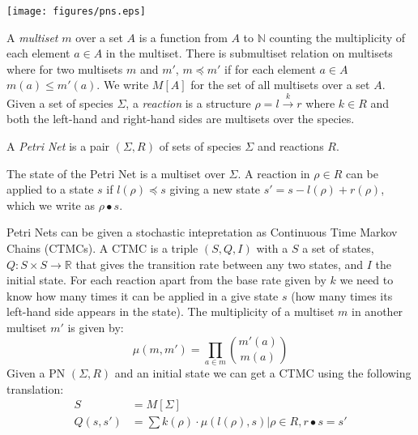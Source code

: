 \documentclass[phd]{infthesis}
\begin{document}
\begin{center}
    \texttt{[image: figures/pns.eps]}
\end{center}

A \emph{multiset} $m$ over a set $A$ is a function from $A$ to $\mathbb{N}$ counting
the multiplicity of each element $a \in A$ in the multiset. There is submultiset
relation on multisets where for two multisets $m$ and $m'$, $m \preceq m'$ if for each
element $a \in A$ $m(a) \leq m'(a)$. We write $M[A]$ for the set of all multisets
over a set $A$. Given a set of species $\Sigma$, a \emph{reaction} is a structure $\rho
= l \xrightarrow{k} r$ where $k \in R$ and both the left-hand and right-hand
sides are multisets over the species. 

\begin{definition}
A \emph{Petri Net} is a pair $(\Sigma, R)$ of sets of species $\Sigma$ and reactions $R$.
\end{definition}

The state of the Petri Net is a multiset over $\Sigma$. A reaction in $\rho \in R$ can be
applied to a state $s$ if $l(\rho) \preceq s$ giving a new state $s' = s -
l(\rho) + r(\rho)$, which we write as $\rho \bullet s$.

Petri Nets can be given a stochastic intepretation as Continuous Time Markov
Chains (CTMCs). A CTMC is a triple $(S, Q, I)$ with a $S$ a set of states, $Q: S
\times S \rightarrow \mathbb{R}$ that gives the transition rate between any two states, and $I$
the initial state. For each reaction apart from the base rate given by $k$ we
need to know how many times it can be applied in a give state $s$ (how many
times its left-hand side appears in the state). The multiplicity of a multiset
$m$ in another multiset $m'$ is given by:
$$
\mu(m, m') = \prod_{a \in m}  \binom{m'(a)}{m(a)}
$$
Given a PN $(\Sigma, R)$ and an initial state we can get a CTMC using the following
translation:
\begin{align*}
  S & = M[\Sigma] \\
  Q(s, s') &= \sum {k(\rho) \cdot \mu(l(\rho), s) | \rho \in R, r \bullet s = s'}
\end{align*}


\end{document}
